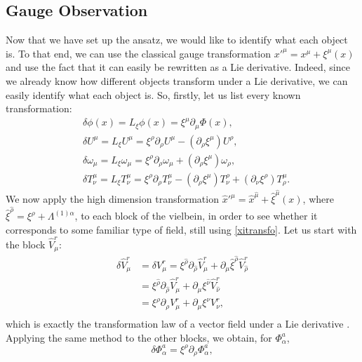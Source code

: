 \documentclass{article}
\begin{document}
\subsection{Gauge Observation} \label{part:gaugeviel}
Now that we have set up the ansatz, we would like to identify what each object is. To that end, we can use the classical gauge transformation $x'^\mu = x^\mu + \xi^{\mu}(x)$ and use the fact that it can easily be rewritten as a Lie derivative.
Indeed, since we already know how different objects transform under a Lie derivative, we can easily identify what each object is.
So, firstly, let us list every known transformation:
 \begin{align} \label{xitransfo}
    &\delta \phi(x) =L_{\xi} \phi(x) = \xi^ {\mu} \partial _ \mu \Phi (x), \\
    &\delta U ^ \mu  =L_{\xi} U ^ \mu = \xi^{\rho} \partial _ \rho U ^ \mu - (\partial _ \rho \xi^{\mu}) U ^\rho, \\
    &\delta  \omega _ \mu  =L_{\xi} \omega _ \mu  =  \xi^{\rho} \partial _ \rho \omega _\mu + (\partial _ \rho \xi^{\mu}) \omega _\rho, \\
    &\delta T ^ \mu _ \nu  =L_{\xi} T ^ \mu _ \nu =\xi^{\rho}  \partial _ \rho T ^ \mu _ \nu -(\partial _ \rho \xi^{\mu} ) T ^ \rho _ \nu + (\partial _ \nu \xi^{\rho})T ^ \mu _ \rho. 
\end{align} 
We now apply the high dimension transformation $\hat x'^{\hat \mu} =\hat x^{\hat \mu} + \hat \xi^{\hat \mu}(x)$, where $\hat \xi^{\hat \rho} = \xi^{\rho}+\Lambda^{(1) \alpha}$, to each block of the vielbein, in order to see whether it corresponds to some familiar type of field, still using \eqref{xitransfo}. Let us start with the block $\hat V^r_\mu$:
\begin{align*}
    \delta \hat V^r_\mu &= \delta V^r_\mu=  \xi^{\hat \rho}  \partial_{\hat \rho} \hat V^{ r}_{ \mu} + \partial_{ \mu} \hat \xi^{ \hat \rho} \hat V^{  r}_{\hat \rho} \\
   &=  \xi^{\hat \rho}  \partial_{\hat \rho} \hat V^{ r}_{ \mu} + \partial_{ \mu} \xi^{ \hat \nu} \hat V^{  r}_{\hat \nu}\\
   &=  \xi^{ \rho}  \partial_{ \rho}  V^{ r}_{ \mu} + \partial_{ \mu} \xi^{  \nu}  V^{  r}_{ \nu},\\
\end{align*}
which is exactly the transformation law of a vector field under a Lie derivative \cite{freedman2012supergravity}. Applying the same method to the other blocks, we obtain, for $\Phi^a_\alpha$,
\begin{equation*}
    \delta \Phi^a_\alpha = \xi^{\rho} \partial_\rho \Phi^a_\alpha,
\end{equation*}
\end{document}
